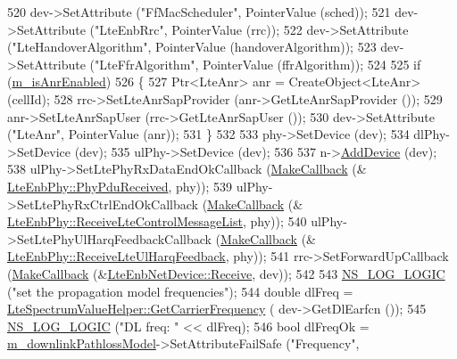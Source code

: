 \begin{DoxyCode}
520   dev->SetAttribute (\textcolor{stringliteral}{"FfMacScheduler"}, PointerValue (sched));
521   dev->SetAttribute (\textcolor{stringliteral}{"LteEnbRrc"}, PointerValue (rrc)); 
522   dev->SetAttribute (\textcolor{stringliteral}{"LteHandoverAlgorithm"}, PointerValue (handoverAlgorithm));
523   dev->SetAttribute (\textcolor{stringliteral}{"LteFfrAlgorithm"}, PointerValue (ffrAlgorithm));
524 
525   \textcolor{keywordflow}{if} (\hyperlink{classns3_1_1LteHelper_a7ea3223dfc520265e1c8423b55b9ab18}{m\_isAnrEnabled})
526     \{
527       Ptr<LteAnr> anr = CreateObject<LteAnr> (cellId);
528       rrc->SetLteAnrSapProvider (anr->GetLteAnrSapProvider ());
529       anr->SetLteAnrSapUser (rrc->GetLteAnrSapUser ());
530       dev->SetAttribute (\textcolor{stringliteral}{"LteAnr"}, PointerValue (anr));
531     \}
532 
533   phy->SetDevice (dev);
534   dlPhy->SetDevice (dev);
535   ulPhy->SetDevice (dev);
536 
537   n->\hyperlink{classns3_1_1Node_a42ff83ee1d5d1649c770d3f5b62375de}{AddDevice} (dev);
538   ulPhy->SetLtePhyRxDataEndOkCallback (\hyperlink{group__makecallbackmemptr_ga9376283685aa99d204048d6a4b7610a4}{MakeCallback} (&
      \hyperlink{classns3_1_1LteEnbPhy_a6f5e3a3285ccb75f962610bd43c0c436}{LteEnbPhy::PhyPduReceived}, phy));
539   ulPhy->SetLtePhyRxCtrlEndOkCallback (\hyperlink{group__makecallbackmemptr_ga9376283685aa99d204048d6a4b7610a4}{MakeCallback} (&
      \hyperlink{classns3_1_1LteEnbPhy_aaf721c86e307ca0c9b2b33cad5c6dad4}{LteEnbPhy::ReceiveLteControlMessageList}, phy));
540   ulPhy->SetLtePhyUlHarqFeedbackCallback (\hyperlink{group__makecallbackmemptr_ga9376283685aa99d204048d6a4b7610a4}{MakeCallback} (&
      \hyperlink{classns3_1_1LteEnbPhy_aea0e8c3c9fee3a8605db9d1d89a23986}{LteEnbPhy::ReceiveLteUlHarqFeedback}, phy));
541   rrc->SetForwardUpCallback (\hyperlink{group__makecallbackmemptr_ga9376283685aa99d204048d6a4b7610a4}{MakeCallback} (&\hyperlink{classns3_1_1LteNetDevice_a52302e688e6fdf9abba088b2b26e5408}{LteEnbNetDevice::Receive}, 
      dev));
542 
543   \hyperlink{group__logging_ga88acd260151caf2db9c0fc84997f45ce}{NS\_LOG\_LOGIC} (\textcolor{stringliteral}{"set the propagation model frequencies"});
544   \textcolor{keywordtype}{double} dlFreq = \hyperlink{classns3_1_1LteSpectrumValueHelper_a07e5a6638c218927b61da7b75ae0b786}{LteSpectrumValueHelper::GetCarrierFrequency} (
      dev->GetDlEarfcn ());
545   \hyperlink{group__logging_ga88acd260151caf2db9c0fc84997f45ce}{NS\_LOG\_LOGIC} (\textcolor{stringliteral}{"DL freq: "} << dlFreq);
546   \textcolor{keywordtype}{bool} dlFreqOk = \hyperlink{classns3_1_1LteHelper_ab60aa166b387a0ed56d54ff7db31b0f0}{m\_downlinkPathlossModel}->SetAttributeFailSafe (\textcolor{stringliteral}{"Frequency"}, 

\end{DoxyCode}
